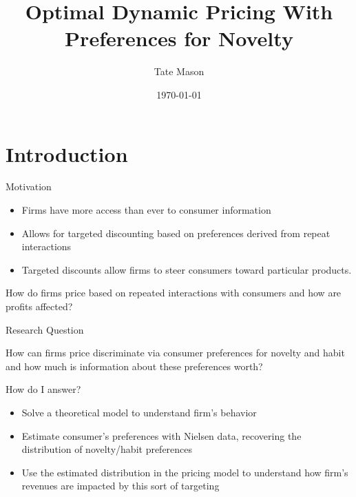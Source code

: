 \documentclass[aspectratio=169,professionalfonts]{beamer}
\title{Optimal Dynamic Pricing With Preferences for Novelty}
\subtitle{}
\author{Tate Mason}
\institute{The University of Georgia}
\date{\today}
\newcommand{\shortbuttons}{}
\begin{document}
\gdef\shortbuttons{}
\begin{frame}[plain,noframenumbering,label=short-0]
  \titlepage
\end{frame}


\section{Introduction}

\gdef\shortbuttons{}
\begin{frame}[label=short-1]{Motivation}
  \begin{itemize}
    \item Firms have more access than ever to consumer information
    \item Allows for targeted discounting based on preferences derived from repeat interactions
    \item Targeted discounts allow firms to steer consumers toward particular products.
  \end{itemize}
  \begin{tcolorbox}
    How do firms price based on repeated interactions with consumers and how are profits affected?
  \end{tcolorbox}
\end{frame}


\gdef\shortbuttons{}
\begin{frame}[label=short-2]{Research Question}
  \begin{tcolorbox}
    How can firms price discriminate via consumer preferences for novelty and habit and how much is information about these preferences worth?
  \end{tcolorbox}
  How do I answer?
  \begin{itemize}
    \item Solve a theoretical model to understand firm's behavior
    \item Estimate consumer's preferences with Nielsen data, recovering the distribution of novelty/habit preferences
    \item Use the estimated distribution in the pricing model to understand how firm's revenues are impacted by this sort of targeting
  \end{itemize}
\end{frame}
\end{document}
